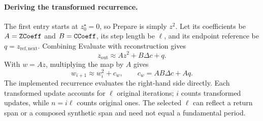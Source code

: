 \paragraph{Deriving the transformed recurrence.}
The first entry starts at $z_0^\star=0$, so Prepare is simply $z^2$.
Let its coefficients be $A=\texttt{ZCoeff}$ and $B=\texttt{CCoeff}$, its
step length be $\ell$, and its endpoint reference be
$q=z_{\mathrm{ref,next}}$. Combining Evaluate with reconstruction gives
\begin{equation}
z_{\mathrm{out}}\approx A z^2+B\Delta c+q.
\label{eq:at-return-map}
\end{equation}
With $w=Az$, multiplying the map by $A$ gives
\begin{equation}
w_{i+1}\approx w_i^2+c_w,\qquad c_w=AB\Delta c+Aq.
\label{eq:at-recurrence}
\end{equation}
The implemented recurrence evaluates the right-hand side directly.
Each transformed update accounts for $\ell$ original iterations;
$i$ counts transformed updates, while $n=i\ell$ counts original ones.
The selected $\ell$ can reflect a return span or a composed synthetic
span and need not equal a fundamental period.

